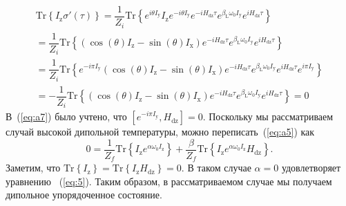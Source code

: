 \documentclass[review]{elsarticle}
\newcommand{\tr}[1]{\mathrm{Tr} \left\{ #1 \right\}}
\newcommand{\sx}{I_\mathrm{x}}
\newcommand{\sy}{I_\mathrm{y}}
\newcommand{\sz}{I_\mathrm{z}}
\newcommand{\hdz}{H_\mathrm{dz}}
\begin{document}
\begin{multline}
    \label{eq:a7} 
    \tr{I_\mathrm{z} \sigma'(\tau)}
    =  \dfrac{1}{Z_{i}} \tr{
        e^{i \theta \sy} \sz e^{-i \theta \sy}
        e^{-i \hdz \tau} e^{\beta_\mathrm{L} \omega_{0} \sy} e^{i \hdz \tau}
    } 
    \\
    = \dfrac{1}{Z_i} \tr{
        \left( \cos(\theta) \sz - \sin(\theta) \sx \right) 
        e^{-i \hdz \tau} e^{\beta_\mathrm{L} \omega_{0} \sy} e^{i \hdz \tau}
    }
    \\
    = \dfrac{1}{Z_i} \tr{
        e^{-i \pi \sy}  
        \left( \cos(\theta) \sz - \sin(\theta) \sx \right) 
        e^{-i \hdz \tau} e^{\beta_\mathrm{L} \omega_{0} \sy} e^{i \hdz \tau}
        e^{i \pi \sy}  
    }
    \\
    = - \dfrac{1}{Z_i} \tr{
        \left( \cos(\theta) \sz - \sin(\theta) \sx \right) 
        e^{-i \hdz \tau} e^{\beta_\mathrm{L} \omega_{0} \sy} e^{i \hdz \tau} 
    } = 0
\end{multline}
%
В~(\ref{eq:a7}) было учтено, что $\left[ e^{-i \pi \sy}, \hdz \right] = 0$.
Поскольку мы рассматриваем случай высокой дипольной температуры, можно переписать~(\ref{eq:a5}) как 
\begin{equation}
    \label{eq:a8}
    0 = \dfrac{1}{Z_f} \tr{ \sz e^{\alpha \omega_0 \sz}}
    + \dfrac{\beta}{Z_f} \tr{\sz e^{\alpha \omega_0 \sz} \hdz}.
\end{equation}
%
Заметим, что $\tr{\sz} = \tr{\sz\hdz} = 0$. В таком случае $\alpha = 0$ удовлетворяет уравнению ~(\ref{eq:5}). 
Таким образом, в рассматриваемом случае мы получаем дипольное упорядоченное состояние.


\end{document}
